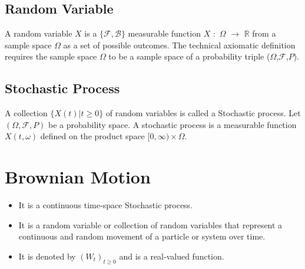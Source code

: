 \documentclass[twoside,final]{hcmut-report}
\begin{document}
         \subsection{Random Variable} A random variable $X$ is a $\{\mathcal{F},\mathcal{B}\}$ measurable function $X$ $\colon$ $\Omega$ $\to$ $\mathbb{R}$ from a sample space $\Omega$  as a set of possible outcomes. The technical axiomatic definition requires the sample space $\Omega $ to be a sample space of a probability triple 
       ($\Omega$,$\mathcal{F}$,$P$).
         \subsection{Stochastic Process}A collection $\{X(t) | t \geq 0\}$ of random variables is called a Stochastic process. Let $(\Omega, \mathcal{F}, P)$ be a probability space. A stochastic process is a measurable function $X(t, \omega)$ defined on the product space $[0,\infty) \times \Omega$.
 \pagebreak
\section{Brownian Motion}
\begin{itemize}
    \item It is a continuous time-space Stochastic process.
    \item It is a random variable or collection of random variables that represent a continuous and random movement of a particle or system over time.
    \item It is denoted by $(W_t)_{t \geq 0}$ and is a real-valued function. 
\end{itemize}
\end{document}
